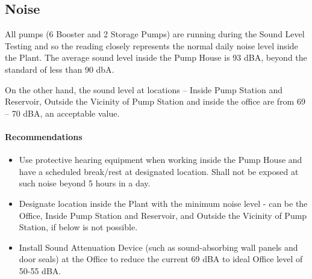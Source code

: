 \subsection{Noise}\label{ch05aq06}
All pumps (6 Booster and 2 Storage Pumps) are running during the Sound Level Testing and so the reading closely represents the normal daily noise level inside the Plant. The average sound level inside the Pump House is 93 dBA, beyond the standard of less than 90 dbA. 

On the other hand, the sound level at locations – Inside Pump Station and Reservoir, Outside the Vicinity of Pump Station and inside the office are from 69 – 70 dBA, an acceptable value.

\paragraph{\textbf{Recommendations}}

\begin{itemize}
\item	Use protective hearing equipment when working inside the Pump House and have a scheduled break/rest at designated location. Shall not be exposed at such noise beyond 5 hours in a day.
\item	Designate location inside the Plant with the minimum noise level - can be the Office, Inside Pump Station and Reservoir, and Outside the Vicinity of Pump Station, if below is not possible.
\item	 Install Sound Attenuation Device (such as sound-absorbing wall panels and door seals) at the Office to reduce the current 69 dBA to ideal Office level of 50-55 dBA.
\end{itemize}



